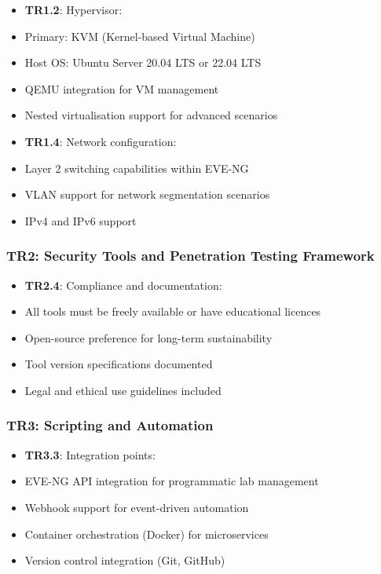 \begin{itemize}
\tightlist
\item
  \textbf{TR1.2}: Hypervisor:
\item
  Primary: KVM (Kernel-based Virtual Machine)
\item
  Host OS: Ubuntu Server 20.04 LTS or 22.04 LTS
\item
  QEMU integration for VM management
\item
  Nested virtualisation support for advanced scenarios
\item
  \textbf{TR1.4}: Network configuration:
\item
  Layer 2 switching capabilities within EVE-NG
\item
  VLAN support for network segmentation scenarios
\item
  IPv4 and IPv6 support
\end{itemize}

\subsubsection{TR2: Security Tools and Penetration Testing Framework}

\begin{itemize}
\tightlist
\item
  \textbf{TR2.4}: Compliance and documentation:
\item
  All tools must be freely available or have educational licences
\item
  Open-source preference for long-term sustainability
\item
  Tool version specifications documented
\item
  Legal and ethical use guidelines included
\end{itemize}

\subsubsection{TR3: Scripting and Automation}

\begin{itemize}
\tightlist
\item
  \textbf{TR3.3}: Integration points:
\item
  EVE-NG API integration for programmatic lab management
\item
  Webhook support for event-driven automation
\item
  Container orchestration (Docker) for microservices
\item
  Version control integration (Git, GitHub)
\end{itemize}

